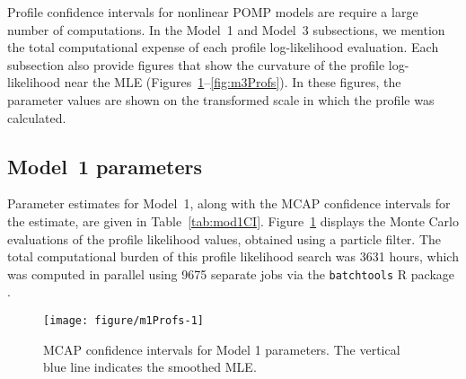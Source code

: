 Profile confidence intervals for nonlinear POMP models are require a large number of computations. In the Model~1 and Model~3 subsections, we mention the total computational expense of each profile log-likelihood evaluation. Each subsection also provide figures that show the curvature of the profile log-likelihood near the MLE (Figures~\ref{fig:m1Profs}--\ref{fig:m3Profs}).
In these figures, the parameter values are shown on the transformed scale in which the profile was calculated.

\subsection{Model~1 parameters}

Parameter estimates for Model~1, along with the MCAP confidence intervals for the estimate, are given in Table~\ref{tab:mod1CI}.
Figure~\ref{fig:m1Profs} displays the Monte Carlo evaluations of the profile likelihood values, obtained using a particle filter.
The total computational burden of this profile likelihood search was 3631 hours, which was computed in parallel using 9675 separate jobs via the \texttt{batchtools} R package \cite{batchtools}.





\begin{figure}[ht]
\begin{knitrout}
\color{fgcolor}
\texttt{[image: figure/m1Profs-1]} 
\end{knitrout}
\caption[MCAP confidence intervals for Model 1 parameters.]{\label{fig:m1Profs}MCAP confidence intervals for Model 1 parameters. The vertical blue line indicates the smoothed MLE.}
\end{figure}

